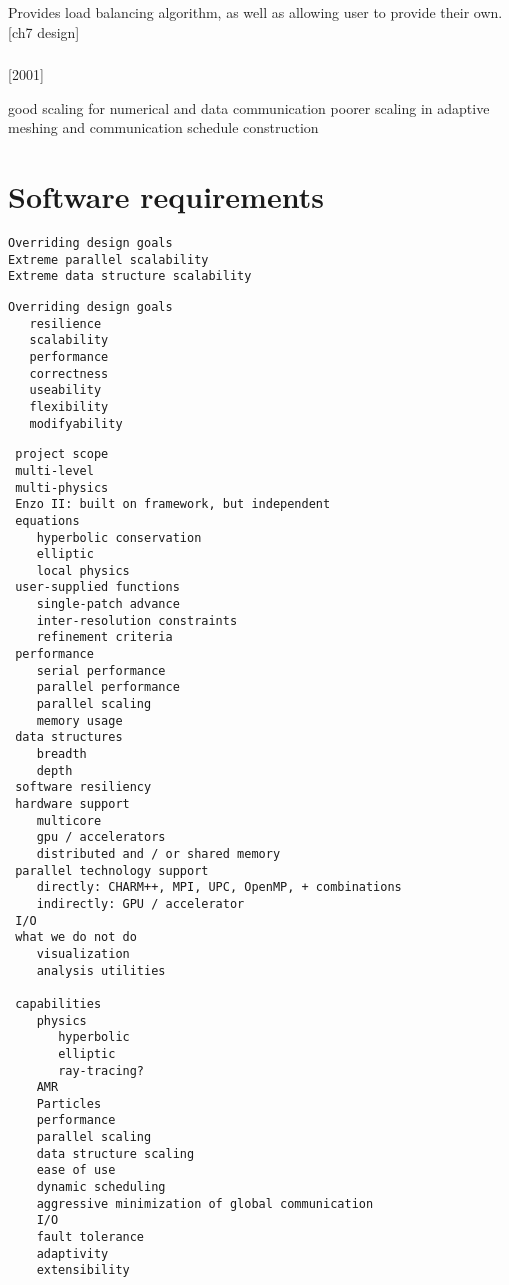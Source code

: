 \documentclass[14pt,letter]{article}
\begin{document}
Provides load balancing algorithm, as well as allowing user to provide their own.
[ch7 design]


\subsubsection{} \label{sss:samrai}

[2001]


good scaling for numerical and data communication
poorer scaling in adaptive meshing and communication schedule construction 


\section{Software requirements} \label{s:requirements}

\begin{verbatim}
Overriding design goals
Extreme parallel scalability
Extreme data structure scalability
\end{verbatim}

\begin{verbatim}
Overriding design goals
   resilience
   scalability
   performance
   correctness
   useability
   flexibility
   modifyability
\end{verbatim}

\begin{verbatim}
 project scope
 multi-level
 multi-physics
 Enzo II: built on framework, but independent
 equations
    hyperbolic conservation
    elliptic
    local physics
 user-supplied functions
    single-patch advance
    inter-resolution constraints
    refinement criteria
 performance
    serial performance
    parallel performance
    parallel scaling
    memory usage
 data structures
    breadth
    depth
 software resiliency
 hardware support
    multicore
    gpu / accelerators
    distributed and / or shared memory
 parallel technology support
    directly: CHARM++, MPI, UPC, OpenMP, + combinations
    indirectly: GPU / accelerator
 I/O
 what we do not do
    visualization
    analysis utilities

 capabilities
    physics
       hyperbolic
       elliptic
       ray-tracing?
    AMR
    Particles
    performance
    parallel scaling
    data structure scaling
    ease of use
    dynamic scheduling
    aggressive minimization of global communication
    I/O
    fault tolerance
    adaptivity
    extensibility
\end{verbatim}
\end{document}
